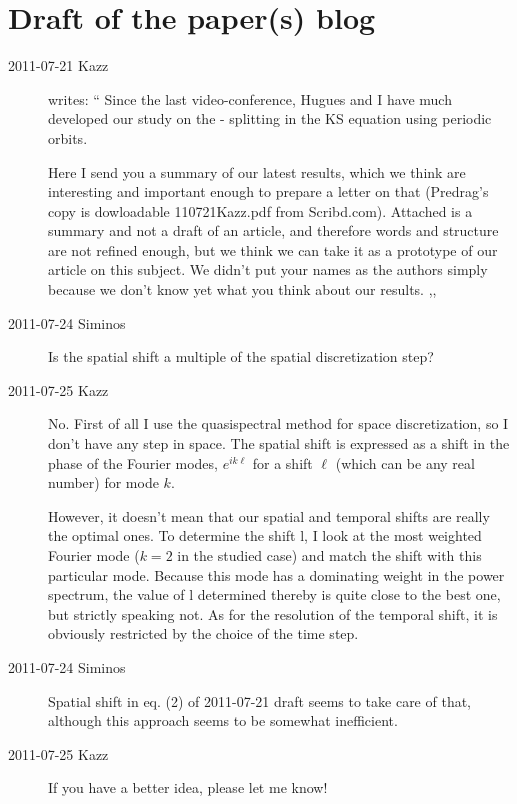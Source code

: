 \newpage
\section{Draft of the paper(s) blog}
\label{sect:DraftBlog}

\begin{description}

\item[2011-07-21 Kazz] writes:
``
Since the last video-conference, Hugues and I have much developed our
study on the {\entangled}-{\transient} splitting in the KS equation using
periodic orbits.

Here I send you a summary of our latest results, which we think are
interesting and important enough to prepare a letter on that (Predrag's
copy is dowloadable
{110721Kazz.pdf} from Scribd.com). Attached is a summary and not a draft of
an article, and therefore words and structure are not refined enough, but
we think we can take it as a prototype of our article on this subject. We
didn't put your names as the authors simply because we don't know yet
what you think about our results.
,,

\item[2011-07-24 Siminos]
Is the spatial shift a multiple of the spatial discretization step?

\item[2011-07-25 Kazz]
No. First of all I use the quasispectral method for space discretization,
so I don't have any step in space. The spatial shift is expressed as a
shift in the phase of the Fourier modes, $e^{ik\ell}$ for a shift ${\ell}$ (which
can be any real number) for mode $k$.

However, it doesn't mean that our spatial and temporal shifts are really
the optimal ones. To determine the shift l, I look at the most weighted
Fourier mode ($k=2$ in the studied case) and match the shift with this
particular mode. Because this mode has a dominating weight in the power
spectrum, the value of l determined thereby is quite close to the best
one, but strictly speaking not. As for the resolution of the temporal
shift, it is obviously restricted by the choice of the time step.

\item[2011-07-24 Siminos]
Spatial shift in eq. (2) of 2011-07-21 draft seems to take care
of that, although this approach seems to be somewhat inefficient.

\item[2011-07-25 Kazz]
If you have a better idea, please let me know!


\end{description}

